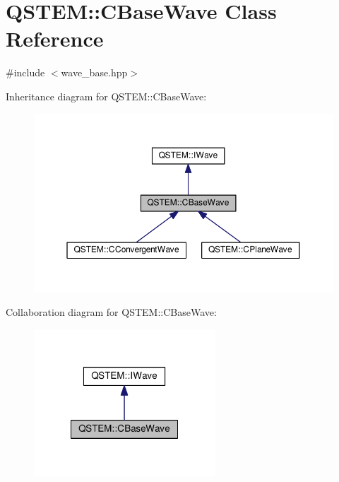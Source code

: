 \hypertarget{class_q_s_t_e_m_1_1_c_base_wave}{\section{Q\-S\-T\-E\-M\-:\-:C\-Base\-Wave Class Reference}
\label{class_q_s_t_e_m_1_1_c_base_wave}
}


{\ttfamily \#include $<$wave\-\_\-base.\-hpp$>$}



Inheritance diagram for Q\-S\-T\-E\-M\-:\-:C\-Base\-Wave\-:
\nopagebreak
\begin{figure}[H]
\begin{center}
\leavevmode
\includegraphics[width=350pt]{class_q_s_t_e_m_1_1_c_base_wave__inherit__graph}
\end{center}
\end{figure}


Collaboration diagram for Q\-S\-T\-E\-M\-:\-:C\-Base\-Wave\-:
\nopagebreak
\begin{figure}[H]
\begin{center}
\leavevmode
\includegraphics[width=192pt]{class_q_s_t_e_m_1_1_c_base_wave__coll__graph}
\end{center}
\end{figure}
